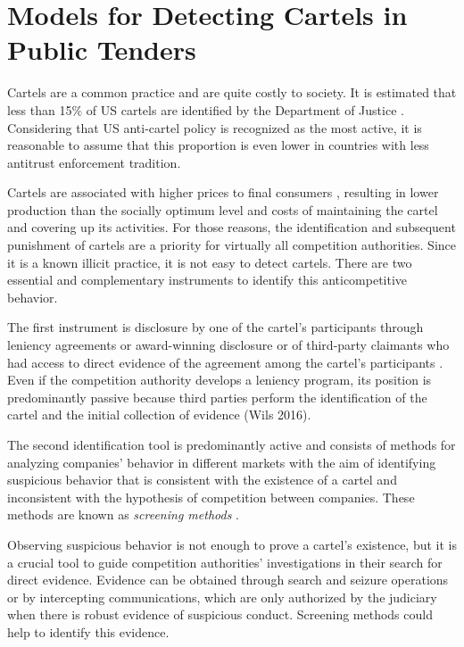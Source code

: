 \documentclass[10pt]{article}
\begin{document}
\section{Models for Detecting Cartels in Public Tenders}

Cartels are a common practice and are quite costly to society. It is estimated that less than 15$\%$ of US cartels are identified by the Department of Justice  \cite{bryant1991price}. Considering that US anti-cartel policy is recognized as the most active, it is reasonable to assume that this proportion is even lower in countries with less antitrust enforcement tradition.

 Cartels are associated with higher prices to final consumers  \cite{connor2007price}, resulting in lower production than the socially optimum level and costs of maintaining the cartel and covering up its activities. For those reasons, the identification and subsequent punishment of cartels are a priority for virtually all competition authorities. Since it is a known illicit practice, it is not easy to detect cartels. There are two essential and complementary instruments to identify this anticompetitive behavior.

 The first instrument is disclosure by one of the cartel’s participants through leniency agreements or award-winning disclosure or of third-party claimants who had access to direct evidence of the agreement among the cartel’s participants  \cite{wils2007leniency}. Even if the competition authority develops a leniency program, its position is predominantly passive because third parties perform the identification of the cartel and the initial collection of evidence (Wils 2016).

 The second identification tool is predominantly active and consists of methods for analyzing companies’ behavior in different markets with the aim of identifying suspicious behavior that is consistent with the existence of a cartel and inconsistent with the hypothesis of competition between companies. These methods are known as \textit{screening methods}  \cite{harrington2008detecting}.

 Observing suspicious behavior is not enough to prove a cartel’s existence, but it is a crucial tool to guide competition authorities’ investigations in their search for direct evidence. Evidence can be obtained through search and seizure operations or by intercepting communications, which are only authorized by the judiciary when there is robust evidence of suspicious conduct. Screening methods could help to identify this evidence.
\end{document}
